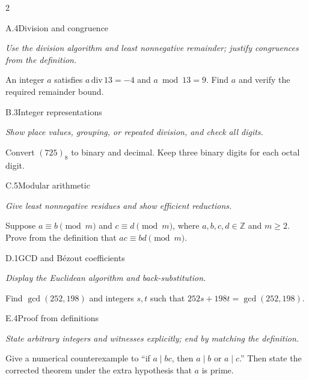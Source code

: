 \documentclass[9pt]{extarticle}
\begin{document}
\begin{multicols}{2}
\begin{CoreProblem}{A.4}{Division and congruence}
{\scriptsize\textit{Use the division algorithm and least nonnegative remainder; justify congruences from the definition.}\par}
An integer $a$ satisfies $a\,\mathrm{div}\,13=-4$ and $a\bmod13=9$.
Find $a$ and verify the required remainder bound.
\end{CoreProblem}
\begin{CoreProblem}{B.3}{Integer representations}
{\scriptsize\textit{Show place values, grouping, or repeated division, and check all digits.}\par}
Convert $(725)_8$ to binary and decimal. Keep three binary digits for each
octal digit.
\end{CoreProblem}
\begin{CoreProblem}{C.5}{Modular arithmetic}
{\scriptsize\textit{Give least nonnegative residues and show efficient reductions.}\par}
Suppose $a\equiv b\pmod m$ and $c\equiv d\pmod m$, where
$a,b,c,d\in\mathbb Z$ and $m\ge2$. Prove from the definition that
$ac\equiv bd\pmod m$.
\end{CoreProblem}
\columnbreak
\begin{CoreProblem}{D.1}{GCD and B\'ezout coefficients}
{\scriptsize\textit{Display the Euclidean algorithm and back-substitution.}\par}
Find $\gcd(252,198)$ and integers $s,t$ such that
$252s+198t=\gcd(252,198)$.
\end{CoreProblem}
\begin{CoreProblem}{E.4}{Proof from definitions}
{\scriptsize\textit{State arbitrary integers and witnesses explicitly; end by matching the definition.}\par}
Give a numerical counterexample to ``if $a\mid bc$, then $a\mid b$ or
$a\mid c$.'' Then state the corrected theorem under the extra hypothesis that
$a$ is prime.
\end{CoreProblem}
\end{multicols}
\CoreWorkArea
\FormBreak
{}
\end{document}
